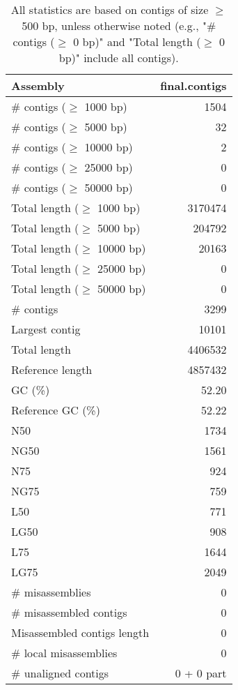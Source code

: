 \documentclass[12pt,a4paper]{article}
\begin{document}
\begin{table}[ht]
\begin{center}
\caption{All statistics are based on contigs of size $\geq$ 500 bp, unless otherwise noted (e.g., "\# contigs ($\geq$ 0 bp)" and "Total length ($\geq$ 0 bp)" include all contigs).}
\begin{tabular}{|l*{1}{|r}|}
\hline
Assembly & final.contigs \\ \hline
\# contigs ($\geq$ 1000 bp) & 1504 \\ \hline
\# contigs ($\geq$ 5000 bp) & 32 \\ \hline
\# contigs ($\geq$ 10000 bp) & 2 \\ \hline
\# contigs ($\geq$ 25000 bp) & 0 \\ \hline
\# contigs ($\geq$ 50000 bp) & 0 \\ \hline
Total length ($\geq$ 1000 bp) & 3170474 \\ \hline
Total length ($\geq$ 5000 bp) & 204792 \\ \hline
Total length ($\geq$ 10000 bp) & 20163 \\ \hline
Total length ($\geq$ 25000 bp) & 0 \\ \hline
Total length ($\geq$ 50000 bp) & 0 \\ \hline
\# contigs & 3299 \\ \hline
Largest contig & 10101 \\ \hline
Total length & 4406532 \\ \hline
Reference length & 4857432 \\ \hline
GC (\%) & 52.20 \\ \hline
Reference GC (\%) & 52.22 \\ \hline
N50 & 1734 \\ \hline
NG50 & 1561 \\ \hline
N75 & 924 \\ \hline
NG75 & 759 \\ \hline
L50 & 771 \\ \hline
LG50 & 908 \\ \hline
L75 & 1644 \\ \hline
LG75 & 2049 \\ \hline
\# misassemblies & 0 \\ \hline
\# misassembled contigs & 0 \\ \hline
Misassembled contigs length & 0 \\ \hline
\# local misassemblies & 0 \\ \hline
\# unaligned contigs & 0 + 0 part \\ \hline

\end{tabular}
\end{center}
\end{table}
\end{document}
